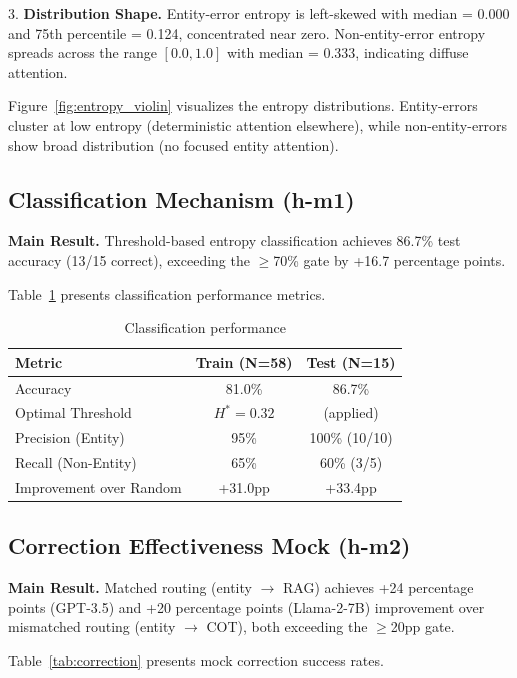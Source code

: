 3. \textbf{Distribution Shape.} Entity-error entropy is left-skewed with median = 0.000 and 75th percentile = 0.124, concentrated near zero. Non-entity-error entropy spreads across the range $[0.0, 1.0]$ with median = 0.333, indicating diffuse attention.

Figure~\ref{fig:entropy_violin} visualizes the entropy distributions. Entity-errors cluster at low entropy (deterministic attention elsewhere), while non-entity-errors show broad distribution (no focused entity attention).

\subsection{Classification Mechanism (h-m1)}

\textbf{Main Result.} Threshold-based entropy classification achieves 86.7\% test accuracy (13/15 correct), exceeding the $\geq$70\% gate by +16.7 percentage points.

Table~\ref{tab:classification} presents classification performance metrics.

\begin{table}[h]
\centering
\caption{Classification performance}
\label{tab:classification}
\begin{tabular}{lcc}
\toprule
Metric & Train (N=58) & Test (N=15) \\
\midrule
Accuracy & 81.0\% & 86.7\% \\
Optimal Threshold & $H^* = 0.32$ & (applied) \\
Precision (Entity) & 95\% & 100\% (10/10) \\
Recall (Non-Entity) & 65\% & 60\% (3/5) \\
Improvement over Random & +31.0pp & +33.4pp \\
\bottomrule
\end{tabular}
\end{table}

\subsection{Correction Effectiveness Mock (h-m2)}

\textbf{Main Result.} Matched routing (entity $\to$ RAG) achieves +24 percentage points (GPT-3.5) and +20 percentage points (Llama-2-7B) improvement over mismatched routing (entity $\to$ COT), both exceeding the $\geq$20pp gate.

Table~\ref{tab:correction} presents mock correction success rates.

